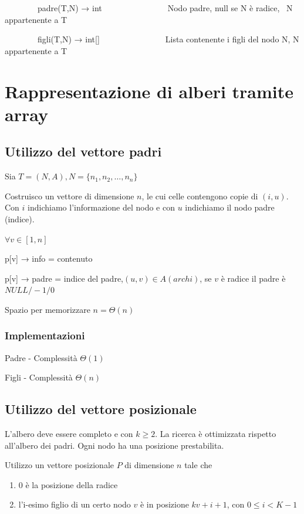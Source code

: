 \documentclass{article}
\providecommand{\tightlist}{%
  \setlength{\itemsep}{0pt}\setlength{\parskip}{0pt}}
\begin{document}
{{{{~~~~~~~~padre(T,N) → int~~~~~~~~~~~~~~~~Nodo padre, null se N è radice,
~N appartenente a T}

{~~~~~~~~figli(T,N) → int{[}{]}~~~~~~~~~~~~~~~~Lista contenente i figli
del nodo N, N appartenente a T}

{}

\section{Rappresentazione di alberi tramite array}

\subsection{Utilizzo del vettore padri}

{Sia $T=(N,A), N = \{n_1,n_2,\ldots,n_n\}$}

{Costruisco un vettore di dimensione $n$, le cui celle contengono copie di $(i,u)$. Con $i$ indichiamo l'informazione del nodo e con $u$ indichiamo il nodo padre (indice).}

$\forall v \in [1,n]$

{p{[}v{]} → info = contenuto}

{p{[}v{]} → padre = indice del padre,$(u,v) \in A(archi)$, se $v$ è radice il padre è $NULL/-1/0$}

{Spazio per memorizzare $n=\Theta(n)$}

\subsubsection{Implementazioni}

{Padre - Complessità $\Theta(1)$}



{Figli - Complessità $\Theta(n)$}



\subsection{Utilizzo del vettore posizionale}

{L'albero deve essere completo e con $k \geq 2$. La ricerca è ottimizzata rispetto all'albero dei padri. Ogni nodo ha una posizione prestabilita.}

{Utilizzo un vettore posizionale $P$ di dimensione $n$ tale che }

\begin{enumerate}
\tightlist
\item
  {0 è la posizione della radice}
\item
  {l'i-esimo figlio di un certo nodo $v$ è in posizione $kv+i+1$, con $0\leq i < K-1$}
\end{enumerate}

}}}
\end{document}
